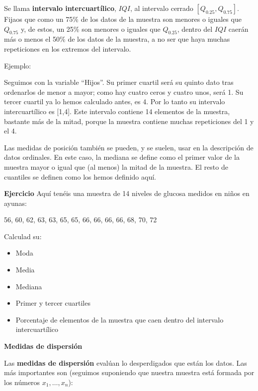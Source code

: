 \documentclass[
  spanish,
  letterpaper,
  DIV=11,
  numbers=noendperiod]{scrreprt}
\providecommand{\tightlist}{%
  \setlength{\itemsep}{0pt}\setlength{\parskip}{0pt}}
\begin{document}
Se llama \textbf{intervalo intercuartílico}, \(\mathit{IQI}\), al
intervalo cerrado \([Q_{0.25},Q_{0.75}]\). Fijaos que como un 75\% de
los datos de la muestra son menores o iguales que \(Q_{0.75}\) y, de
estos, un 25\% son menores o iguales que \(Q_{0.25}\), dentro del
\(\mathit{IQI}\) caerán más o menos el 50\% de los datos de la muestra,
a no ser que haya muchas repeticiones en los extremos del intervalo.

Ejemplo:

Seguimos con la variable ``Hijos''. Su primer cuartil será su quinto
dato tras ordenarlos de menor a mayor; como hay cuatro ceros y cuatro
unos, será 1. Su tercer cuartil ya lo hemos calculado antes, es 4. Por
lo tanto su intervalo intercuartílico es {[}1,4{]}. Este intervalo
contiene 14 elementos de la muestra, bastante más de la mitad, porque la
muestra contiene muchas repeticiones del 1 y el 4.

Las medidas de posición también se pueden, y se suelen, usar en la
descripción de datos ordinales. En este caso, la mediana se define como
el primer valor de la muestra mayor o igual que (al menos) la mitad de
la muestra. El resto de cuantiles se definen como los hemos definido
aquí.

\textbf{Ejercicio} Aquí tenéis una muestra de 14 niveles de glucosa
medidos en niños en ayunas:

56, 60, 62, 63, 63, 65, 65, 66, 66, 66, 66, 68, 70, 72

Calculad su:

\begin{itemize}
\tightlist
\item
  Moda
\item
  Media
\item
  Mediana
\item
  Primer y tercer cuartiles
\item
  Porcentaje de elementos de la muestra que caen dentro del intervalo
  intercuartílico
\end{itemize}

\textbf{Medidas de dispersión}

Las \textbf{medidas de dispersión} evalúan lo desperdigados que están
los datos. Las más importantes son (seguimos suponiendo que nuestra
muestra está formada por los números \(x_1,\ldots,x_n\)):
\end{document}

